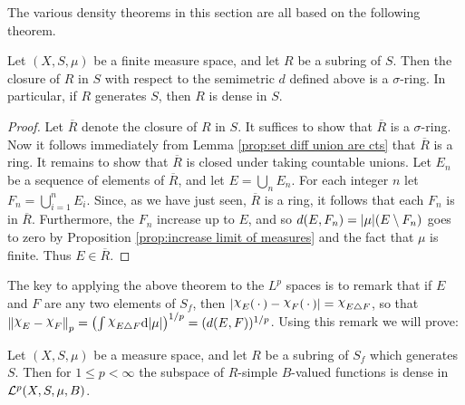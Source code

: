 The various density theorems in this section are all based on the following theorem.

\begin{theorem}\label{thm:closure of subring}
Let $(X,S,\mu)$ be a finite measure space, and let $R$ be a subring of $S$. Then the closure of $R$ in $S$ with respect to the semimetric $d$ defined above is a $\sigma$-ring. In particular, if $R$ generates $S$, then $R$ is dense in $S$.
\end{theorem}

\begin{proof}
Let $\overline{R}$ denote the closure of $R$ in $S$. It suffices to show that $\overline{R}$ is a $\sigma$-ring. Now it follows immediately from Lemma \ref{prop:set diff union are cts} that $\overline{R}$ is a ring. It remains to show that $\overline{R}$ is closed under taking countable unions. Let $E_n$ be a sequence of elements of $\overline{R}$, and let $E=\bigcup_nE_n$. For each integer $n$ let $F_n=\bigcup_{i=1}^nE_i$. Since, as we have just seen, $\overline{R}$ is a ring, it follows that each $F_n$ is in $\overline{R}$. Furthermore, the $F_n$ increase up to $E$, and so $d(E,F_n)=|\mu|(E\setminus F_n)$ goes to zero by Proposition \ref{prop:increase limit of measures} and the fact that $\mu$ is finite. Thus $E\in\overline{R}$.
\end{proof}

The key to applying the above theorem to the $L^p$ spaces is to remark that if $E$ and $F$ are any two elements of $S_f$, then $|\idf{E}(\imarg)-\idf{F}(\imarg)|=\idf{E\symd F}$, so that $\norm{\idf{E}-\idf{F}}_p=\br{\int\idf{E\symd F}\dd|\mu|}^{1/p}=(d(E,F))^{1/p}$. Using this remark we will prove:

\begin{theorem}\label{thm:R ISF dense in Lp}
Let $(X,S,\mu)$ be a measure space, and let $R$ be a subring of $S_f$ which generates $S$. Then for $1\leq p<\infty$ the subspace of $R$-simple $B$-valued functions is dense in ${\cal L}^p(X,S,\mu,B)$.
\end{theorem}

